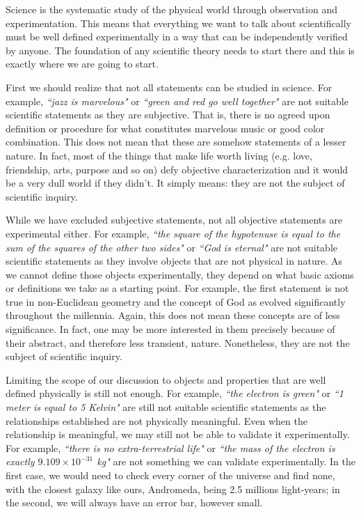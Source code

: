 \documentclass[11pt,letterpaper,fleqn]{memoir} %
\begin{document}
Science is the systematic study of the physical world through observation and experimentation. This means that everything we want to talk about scientifically must be well defined experimentally in a way that can be independently verified by anyone. The foundation of any scientific theory needs to start there and this is exactly where we are going to start.

First we should realize that not all statements can be studied in science. For example, \emph{``jazz is marvelous"} or \emph{``green and red go well together"} are not suitable scientific statements as they are subjective. That is, there is no agreed upon definition or procedure for what constitutes marvelous music or good color combination. This does not mean that these are somehow statements of a lesser nature. In fact, most of the things that make life worth living (e.g. love, friendship, arts, purpose and so on) defy objective characterization and it would be a very dull world if they didn't. It simply means: they are not the subject of scientific inquiry.

While we have excluded subjective statements, not all objective statements are experimental either. For example, \emph{``the square of the hypotenuse is equal to the sum of the squares of the other two sides"} or \emph{``God is eternal"} are not suitable scientific statements as they involve objects that are not physical in nature. As we cannot define those objects experimentally, they depend on what basic axioms or definitions we take as a starting point. For example, the first statement is not true in non-Euclidean geometry and the concept of God as evolved significantly throughout the millennia. Again, this does not mean these concepts are of less significance. In fact, one may be more interested in them precisely because of their abstract, and therefore less transient, nature. Nonetheless, they are not the subject of scientific inquiry.

Limiting the scope of our discussion to objects and properties that are well defined physically is still not enough. For example, \emph{``the electron is green"} or \emph{``1 meter is equal to 5 Kelvin"} are still not suitable scientific statements as the relationships established are not physically meaningful. Even when the relationship is meaningful, we may still not be able to validate it experimentally. For example, \emph{``there is no extra-terrestrial life"} or \emph{``the mass of the electron is exactly $9.109 \times 10^{-31}$ kg"} are not something we can validate experimentally. In the first case, we would need to check every corner of the universe and find none, with the closest galaxy like ours, Andromeda, being 2.5 millions light-years; in the second, we will always have an error bar, however small.
\end{document}
